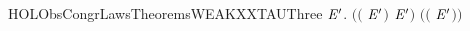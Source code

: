 \newcommand{\HOLObsCongrLawsTheoremsWEAKXXTAUTwo}{\UseVerbatim{HOLObsCongrLawsTheoremsWEAKXXTAUTwo}}
\begin{SaveVerbatim}{HOLObsCongrLawsTheoremsWEAKXXTAUThree}
\HOLTokenTurnstile{} \HOLSymConst{\HOLTokenForall{}}  \ensuremath{\HOLBoundVar{E}\sp{\prime}}.  \ensuremath{(}\HOLSymConst{\ensuremath{\ldotp}}\ensuremath{(} \HOLSymConst{\ensuremath{+}} \HOLConst{\ensuremath{\tau}}\HOLSymConst{\ensuremath{\ldotp}}\ensuremath{\HOLBoundVar{E}\sp{\prime}}\ensuremath{)} \HOLSymConst{\ensuremath{+}} \HOLSymConst{\ensuremath{\ldotp}}\ensuremath{\HOLBoundVar{E}\sp{\prime}}\ensuremath{)} \ensuremath{(}\HOLSymConst{\ensuremath{\ldotp}}\ensuremath{(} \HOLSymConst{\ensuremath{+}} \HOLConst{\ensuremath{\tau}}\HOLSymConst{\ensuremath{\ldotp}}\ensuremath{\HOLBoundVar{E}\sp{\prime}}\ensuremath{)}\ensuremath{)}
\end{SaveVerbatim}
\newcommand{\HOLObsCongrLawsTheoremsWEAKXXTAUThree}{\UseVerbatim{HOLObsCongrLawsTheoremsWEAKXXTAUThree}}
